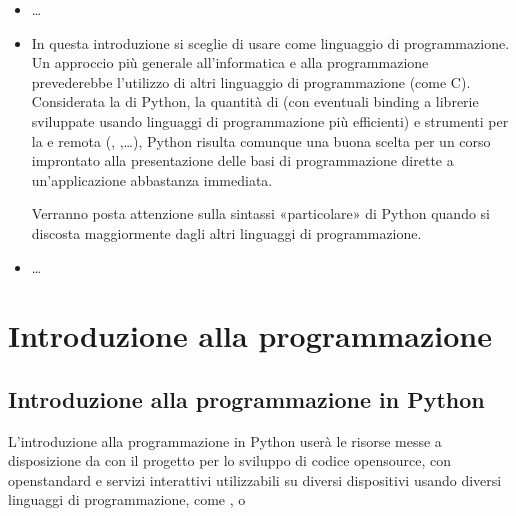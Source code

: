 \documentclass[letterpaper,10pt,italian]{jupyterBook}
\begin{document}
\sphinxAtStartPar
{}



\sphinxAtStartPar
{}
\begin{itemize}
\item {} 
\sphinxAtStartPar
{} …

\item {} 
\sphinxAtStartPar
{} In questa introduzione si sceglie di usare  come linguaggio di programmazione.
Un approccio più generale all’informatica e alla programmazione prevederebbe l’utilizzo di altri linguaggio di programmazione (come C).
Considerata la  di Python, la quantità di  (con eventuali binding a librerie sviluppate usando linguaggi di programmazione più efficienti) e strumenti per la  e remota (, ,…), Python risulta comunque una buona scelta per un corso improntato alla presentazione delle basi di programmazione dirette a un’applicazione abbastanza immediata.

\sphinxAtStartPar
Verranno posta attenzione sulla sintassi «particolare» di Python quando si discosta maggiormente dagli altri linguaggi di programmazione.

\item {} 
\sphinxAtStartPar
{} …

\end{itemize}

\sphinxstepscope


\part{Introduzione alla programmazione}

\sphinxstepscope


\chapter{Introduzione alla programmazione \sphinxhyphen{} in Python}
\label{\detokenize{ch/programming:introduzione-alla-programmazione-in-python}}\label{\detokenize{ch/programming:book-programming-intro-hs}}\label{\detokenize{ch/programming::doc}}
\sphinxAtStartPar
L’introduzione alla programmazione in Python userà le risorse messe a disposizione da  con il progetto  per lo sviluppo di codice open\sphinxhyphen{}source, con open\sphinxhyphen{}standard e servizi interattivi utilizzabili su diversi dispositivi usando diversi linguaggi di programmazione, come ,  o 
\end{document}
